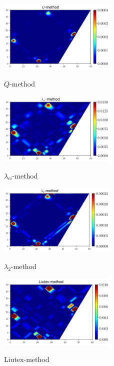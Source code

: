 \documentclass[a4wide,fontsize=12pt]{article}
\begin{document}
\begin{figure}
\begin{multicols}{2}
    \centering
    \includegraphics[width=0.5\textwidth]{Figs/VortexQ.png}
    \caption{$Q$-method}
    \label{fig:Q}
    \hfill
    \includegraphics[width=0.5\textwidth]{Figs/VortexLambdaCi.png}
    \caption{$\lambda_{ci}$-method}
    \label{fig:Lci}
    \end{multicols}
\end{figure}

\begin{figure}
\begin{multicols}{2}
    \centering
    \includegraphics[width=0.5\textwidth]{Figs/VortexLambda2.png}
    \caption{$\lambda_2$-method}
    \label{fig:L2}
    \hfill
    \includegraphics[width=0.5\textwidth]{Figs/VortexLui.png}
    \caption{Liutex-method}
    \label{fig:Liu}
    \end{multicols}
\end{figure}
\end{document}
